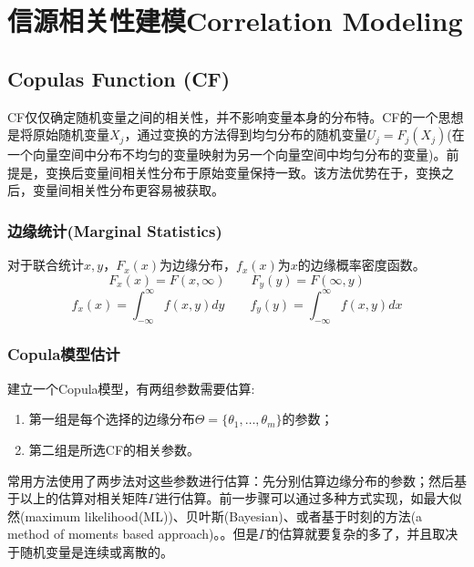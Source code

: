 \section{信源相关性建模Correlation Modeling}
\subsection{Copulas Function (CF)}
CF仅仅确定随机变量之间的相关性，并不影响变量本身的分布特。CF的一个思想是将原始随机变量$X_j$，通过变换的方法得到均匀分布的随机变量$U_j = F_j(X_j)$(在一个向量空间中分布不均匀的变量映射为另一个向量空间中均匀分布的变量)。前提是，变换后变量间相关性分布于原始变量保持一致。该方法优势在于，变换之后，变量间相关性分布更容易被获取。
\subsubsection{边缘统计(Marginal Statistics)}
对于联合统计$x,y$，$F_x(x)$为边缘分布，$f_x(x)$为$x$的边缘概率密度函数。
\begin{equation}
    F_x(x) = F(x,\infty) \qquad F_y(y) = F(\infty,y)
    \label{eq0.1}
\end{equation}
\begin{equation}
    f_x(x) = \int_{-\infty}^{\infty} f(x,y) dy \qquad f_y(y) = \int_{-\infty}^{\infty} f(x,y) dx
    \label{eq0.2}
\end{equation}
\subsubsection{Copula模型估计}
建立一个Copula模型，有两组参数需要估算:
\begin{enumerate}
    \item 第一组是每个选择的边缘分布$\Theta = \{\theta_1,\dots,\theta_m\}$的参数；
    \item 第二组是所选CF的相关参数。
\end{enumerate}
常用方法使用了两步法对这些参数进行估算：先分别估算边缘分布的参数；然后基于以上的估算对相关矩阵$\Gamma$进行估算。前一步骤可以通过多种方式实现，如最大似然(maximum likelihood(ML))、贝叶斯(Bayesian)、或者基于时刻的方法(a method of moments based approach)。。但是$\Gamma$的估算就要复杂的多了，并且取决于随机变量是连续或离散的。
